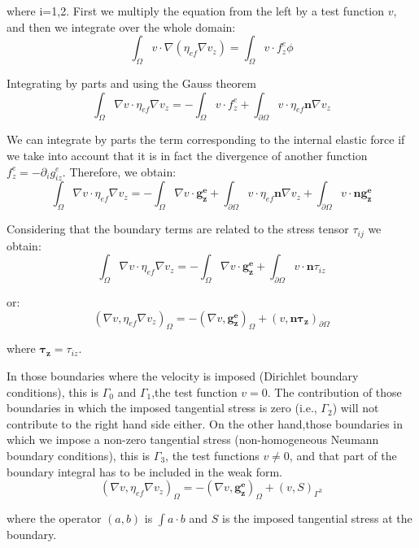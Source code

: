 where i=1,2. First we multiply the equation from the left by a test function $v$, and then we integrate over the whole domain\-: \[\int_{\Omega} v \cdot \nabla\left(\eta_{ef}\nabla v_z \right) = \int_{\Omega} v \cdot f^e_z \phi \]

Integrating by parts and using the Gauss theorem \[ \int_{\Omega} \nabla v \cdot \eta_{ef}\nabla v_z = -\int_{\Omega} v \cdot f^e_z + \int_{\partial \Omega} v \cdot \eta_{ef} \boldsymbol{n} \nabla v_z \]

We can integrate by parts the term corresponding to the internal elastic force if we take into account that it is in fact the divergence of another function $ f^e_z = -\partial_i g^e_{iz} $. Therefore, we obtain\-: \[ \int_{\Omega} \nabla v \cdot \eta_{ef}\nabla v_z = -\int_{\Omega} \nabla v \cdot \boldsymbol{g^e_z} + \int_{\partial \Omega} v \cdot \eta_{ef} \boldsymbol{n} \nabla v_z + \int_{\partial \Omega} v \cdot \boldsymbol{n} \boldsymbol{g^e_z} \]

Considering that the boundary terms are related to the stress tensor $ \tau_{ij}$ we obtain\-: \[ \int_{\Omega} \nabla v \cdot \eta_{ef}\nabla v_z = -\int_{\Omega} \nabla v \cdot \boldsymbol{g^e_z} + \int_{\partial \Omega} v \cdot \boldsymbol{n} \tau_{iz} \]

or\-: \[ \left( \nabla v, \eta_{ef}\nabla v_z \right)_{\Omega} = - \left( \nabla v, \boldsymbol{g^e_z} \right)_{\Omega} + \left(v, \boldsymbol{n} \boldsymbol{\tau_{z}} \right)_{\partial \Omega} \]

where $\boldsymbol{\tau_{z}} = \tau_{iz}$.

In those boundaries where the velocity is imposed (Dirichlet boundary conditions), this is $\Gamma_0$ and $\Gamma_1$,the test function $v = 0$. The contribution of those boundaries in which the imposed tangential stress is zero (i.\-e., $\Gamma_2$) will not contribute to the right hand side either. On the other hand,those boundaries in which we impose a non-\/zero tangential stress (non-\/homogeneous Neumann boundary conditions), this is $\Gamma_3$, the test functions $v \neq 0$, and that part of the boundary integral has to be included in the weak form. \[ \left( \nabla v, \eta_{ef}\nabla v_z \right)_{\Omega} = - \left( \nabla v, \boldsymbol{g^e_z} \right)_{\Omega} + \left(v, S \right)_{\Gamma^3} \]

where the operator $(a, b)$ is $ \int a \cdot b $ and $S$ is the imposed tangential stress at the boundary.

